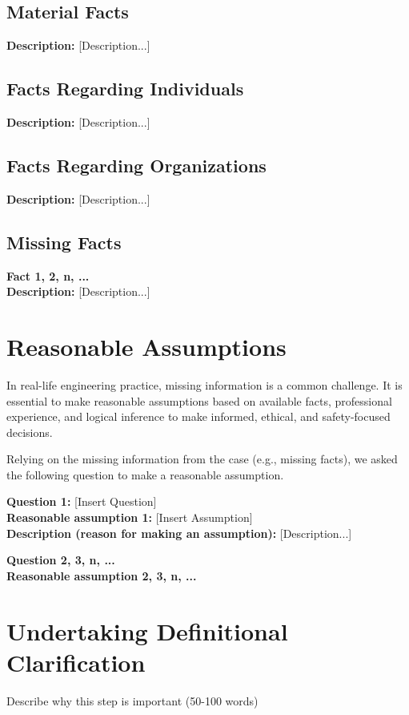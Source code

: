 \documentclass[12pt,a4paper]{article}
\begin{document}
\subsection{Material Facts}
\textbf{Description:} [Description...]

\subsection{Facts Regarding Individuals}
\textbf{Description:} [Description...]

\subsection{Facts Regarding Organizations}
\textbf{Description:} [Description...]

\subsection{Missing Facts}
\noindent\textbf{Fact 1, 2, n, ...}\\
\textbf{Description:} [Description...]

\section{Reasonable Assumptions}
In real-life engineering practice, missing information is a common challenge. It is essential to make reasonable assumptions based on available facts, professional experience, and logical inference to make informed, ethical, and safety-focused decisions.

Relying on the missing information from the case (e.g., missing facts), we asked the following question to make a reasonable assumption.

\vspace{0.3cm}
\noindent\textbf{Question 1: } [Insert Question]\\
\textbf{Reasonable assumption 1: } [Insert Assumption]\\
\textbf{Description (reason for making an assumption): } [Description...]

\vspace{0.3cm}
\noindent\textbf{Question 2, 3, n, ...}\\
\textbf{Reasonable assumption 2, 3, n, ...}\\

\section{Undertaking Definitional Clarification}
\vspace{0.3cm}
\noindent Describe why this step is important (50-100 words)
\end{document}
